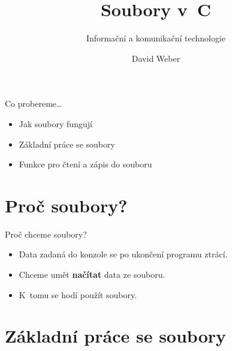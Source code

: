 \documentclass[14pt,aspectratio=169]{beamer}
\title{Soubory v~C}
\subtitle{Informační a komunikační technologie}
\author{David Weber}
\begin{document}

    \begin{frame}
        \titlepage
    \end{frame}

    \begin{frame}[t]{Co probereme\dots}
        \begin{itemize}
            \item Jak soubory fungují
            \item Základní práce se soubory
            \item Funkce pro čtení a zápis do souboru
        \end{itemize}
    \end{frame}

    \section{Proč soubory?}
    \begin{frame}[t]{Proč chceme soubory?}
        \begin{itemize}
            \item Data zadaná do konzole se po ukončení programu ztrácí.
            \begin{center}
            \end{center}
            \item Chceme umět \textbf{načítat} data ze souboru.
            \begin{center}
            \end{center}
            \item K~tomu se hodí použít soubory.
        \end{itemize}
    \end{frame}

    \section{Základní práce se soubory}
\end{document}
